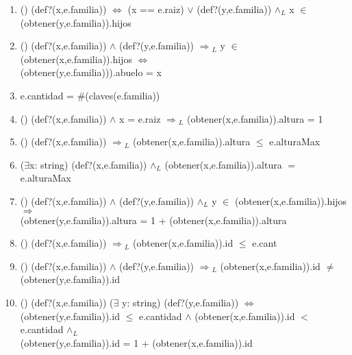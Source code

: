 \documentclass[10pt, a4paper]{article}
\begin{document}
	   \begin{enumerate}

	   \item() (def?(x,e.familia)) $\Longleftrightarrow$ (x == e.raiz) $\vee$ (def?(y,e.familia)) $\wedge{_L}$ x $\in$ (obtener(y,e.familia)).hijos
	       
	    \item () (def?(x,e.familia)) $\wedge$ (def?(y,e.familia)) $\Rightarrow{_L}$ y $\in$ (obtener(x,e.familia)).hijos $\Leftrightarrow$ \\ (obtener(y,e.familia))).abuelo = x

	    \item e.cantidad  = $\#$(claves(e.familia))  
	    
	    \item () (def?(x,e.familia)) $\wedge$ x = e.raiz $\Rightarrow{_L}$ (obtener(x,e.familia)).altura = 1
	    
	    \item () (def?(x,e.familia)) $\Rightarrow{_L}$ (obtener(x,e.familia)).altura $\leq$ e.alturaMax
	    
	    \item ($\exists$x: string) (def?(x,e.familia)) $\wedge{_L}$ (obtener(x,e.familia)).altura $=$ e.alturaMax
	    
	    \item () (def?(x,e.familia)) $\wedge$ (def?(y,e.familia)) $\wedge{_L}$ y $\in$ (obtener(x,e.familia)).hijos $\Rightarrow$ \\ (obtener(y,e.familia)).altura = 1 + (obtener(x,e.familia)).altura
	    
	    \item () (def?(x,e.familia)) $\Rightarrow{_L}$ (obtener(x,e.familia)).id $\leq$ e.cant
	    
	    \item () (def?(x,e.familia)) $\wedge$ (def?(y,e.familia)) $\Rightarrow{_L}$ (obtener(x,e.familia)).id $\neq$ (obtener(y,e.familia)).id
	    
	    \item () (def?(x,e.familia)) ($\exists$ y: string) (def?(y,e.familia)) $\Leftrightarrow$ \\ (obtener(y,e.familia)).id $\leq$ e.cantidad $\wedge$ (obtener(x,e.familia)).id $<$ e.cantidad $\wedge{_L}$ \\(obtener(y,e.familia)).id = 1 + (obtener(x,e.familia)).id
	    
\end{enumerate}
\end{document}
